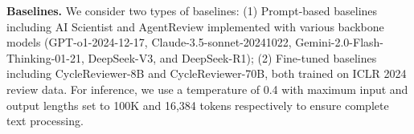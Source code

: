 \documentclass{article}
\begin{document}
\textbf{Baselines.} We consider two types of baselines: (1) Prompt-based baselines including AI Scientist \citep{chris2024the} and AgentReview \citep{jin-etal-2024-agentreview} implemented with various backbone models (GPT-o1-2024-12-17, Claude-3.5-sonnet-20241022, Gemini-2.0-Flash-Thinking-01-21, DeepSeek-V3, and DeepSeek-R1); (2) Fine-tuned baselines including CycleReviewer-8B and CycleReviewer-70B, both trained on ICLR 2024 review data. For inference, we use a temperature of 0.4 with maximum input and output lengths set to 100K and 16,384 tokens respectively to ensure complete text processing.
\end{document}
